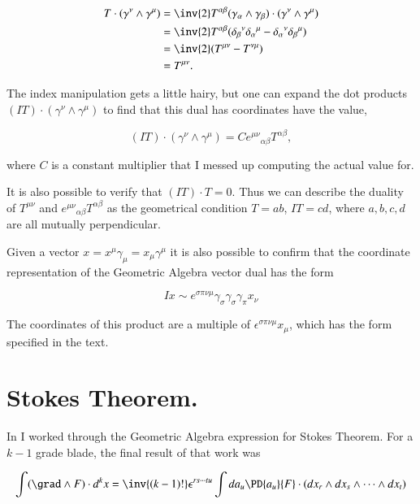 \begin{align*}
T \cdot (\gamma^\nu \wedge \gamma^\mu)
&= 
\inv{2} T^{\alpha \beta} (\gamma_\alpha \wedge \gamma_\beta ) \cdot (\gamma^\nu \wedge \gamma^\mu) \\
&= 
\inv{2} T^{\alpha \beta} ( {\delta_\beta}^\nu {\delta_\alpha}^\mu -{\delta_\alpha}^\nu {\delta_\beta}^\mu ) \\
&= 
\inv{2} (T^{\mu \nu} - T^{\nu \mu}) \\
&= 
T^{\mu \nu}.
\end{align*}

The index manipulation gets a little hairy, but one can expand the dot products $(I T) \cdot (\gamma^\nu \wedge \gamma^\mu)$ to find that this dual has coordinates have the value,

\begin{equation}\label{eqn:antisymmetricTensorTx:530}
(I T) \cdot (\gamma^\nu \wedge \gamma^\mu) = C {e^{\mu \nu}}_{\alpha \beta} T^{\alpha \beta},
\end{equation}

where $C$ is a constant multiplier that I messed up computing the actual value for.

It is also possible to verify that $(IT) \cdot T = 0$.  Thus we can describe the duality of $T^{\mu \nu}$ and ${e^{\mu \nu}}_{\alpha \beta} T^{\alpha \beta}$ as the geometrical condition $T = a b$, $IT = c d$, where $a, b, c, d$ are all mutually perpendicular.

Given a vector $x = x^\mu \gamma_\mu = x_\mu \gamma^\mu$ it is also possible to confirm that the coordinate representation of the Geometric Algebra vector dual has the form

\begin{equation}\label{eqn:antisymmetricTensorTx:540}
I x \sim e^{\sigma \pi \nu \mu} \gamma_\sigma \gamma_\sigma \gamma_\pi x_\nu
\end{equation}

The coordinates of this product are a multiple of $\epsilon^{\sigma \pi \nu \mu } x_\mu$, which has the form specified in the text.

\section{Stokes Theorem.}

In \citep{stokesNoTensor} I worked through the Geometric Algebra expression for Stokes Theorem.  For a $k-1$ grade blade, the final result of that work was

\begin{equation}\label{eqn:antisymmetricTensorTx:600}
\int
( \grad \wedge F ) \cdot d^k x 
=
\inv{(k-1)!} \epsilon^{ r s \cdots t u } \int da_u \PD{a_{u}}{F} \cdot 
(dx_r \wedge dx_s \wedge \cdots \wedge dx_t)
\end{equation}

